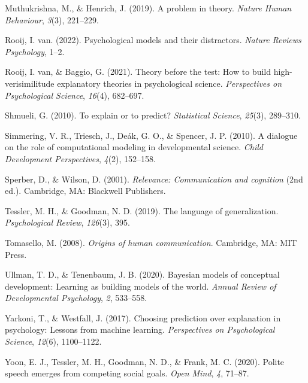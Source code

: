 \documentclass[
  man,floatsintext]{apa6}
\newlength{\cslhangindent}
\newlength{\cslentryspacingunit} %
\newenvironment{CSLReferences}[2] %
 {%
  \setlength{\parindent}{0pt}
  \ifodd #1
  \let\oldpar\par
  \def\par{\hangindent=\cslhangindent\oldpar}
  \fi
  \setlength{\parskip}{#2\cslentryspacingunit}
 }%
 {}
\begin{document}
\begin{CSLReferences}{1}{0}
\leavevmode{}%
Muthukrishna, M., \& Henrich, J. (2019). A problem in theory. \emph{Nature Human Behaviour}, \emph{3}(3), 221--229.

\leavevmode{}%
Rooij, I. van. (2022). Psychological models and their distractors. \emph{Nature Reviews Psychology}, 1--2.

\leavevmode{}%
Rooij, I. van, \& Baggio, G. (2021). Theory before the test: How to build high-verisimilitude explanatory theories in psychological science. \emph{Perspectives on Psychological Science}, \emph{16}(4), 682--697.

\leavevmode{}%
Shmueli, G. (2010). To explain or to predict? \emph{Statistical Science}, \emph{25}(3), 289--310.

\leavevmode{}%
Simmering, V. R., Triesch, J., Deák, G. O., \& Spencer, J. P. (2010). A dialogue on the role of computational modeling in developmental science. \emph{Child Development Perspectives}, \emph{4}(2), 152--158.

\leavevmode{}%
Sperber, D., \& Wilson, D. (2001). \emph{Relevance: Communication and cognition} (2nd ed.). Cambridge, MA: Blackwell Publishers.

\leavevmode{}%
Tessler, M. H., \& Goodman, N. D. (2019). The language of generalization. \emph{Psychological Review}, \emph{126}(3), 395.

\leavevmode{}%
Tomasello, M. (2008). \emph{Origins of human communication}. Cambridge, MA: MIT Press.

\leavevmode{}%
Ullman, T. D., \& Tenenbaum, J. B. (2020). Bayesian models of conceptual development: Learning as building models of the world. \emph{Annual Review of Developmental Psychology}, \emph{2}, 533--558.

\leavevmode{}%
Yarkoni, T., \& Westfall, J. (2017). Choosing prediction over explanation in psychology: Lessons from machine learning. \emph{Perspectives on Psychological Science}, \emph{12}(6), 1100--1122.

\leavevmode{}%
Yoon, E. J., Tessler, M. H., Goodman, N. D., \& Frank, M. C. (2020). Polite speech emerges from competing social goals. \emph{Open Mind}, \emph{4}, 71--87.

\end{CSLReferences}

\endgroup
\end{document}
